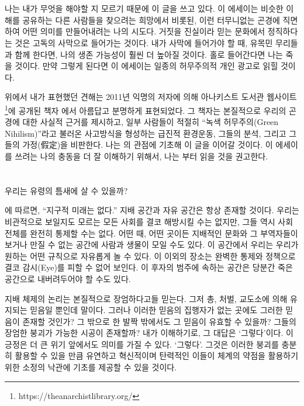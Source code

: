 \documentclass[10pt, b6paper, openany]{memoir}
\begin{document}
\begin{article}
\section{}

나는 내가 무엇을 해야할 지 모르기 때문에 이 글을 쓰고 있다. 이 에세이는 비슷한 이해를 공유하는 다른 사람들을 찾으려는 희망에서 비롯된, 이런 터무니없는 곤경에 직면하여 어떤 의미를 만들어내려는 나의 시도다. 거짓을 진실이라 믿는 문화에서 정직하다는 것은 고독의 사막으로 들어가는 것이다. 내가 사막에 들어가야 할 때, 유목민 무리들과 함께 한다면, 나의 생존 가능성이 훨씬 더 높아질 것이다. 홀로 들어간다면 나는 죽을 것이다. 만약 그렇게 된다면 이 에세이는 일종의 허무주의적 개인 광고로 읽힐 것이다.

위에서 내가 표현했던 견해는 2011년 익명의 저자에 의해 아나키스트 도서관 웹사이트\footnote{https://theanarchistlibrary.org/}에 공개된 책자 \parencite{bk:desert2011}에서 아름답고 분명하게 표현되었다. 그 책자는 본질적으로 우리의 곤경에 대한 사실적 근거를 제시하고, 일부 사람들이 적절히 ``녹색 허무주의(Green Nihilism)''라고 불러온 사고방식을 형성하는 급진적 환경운동, 그들의 분석, 그리고 그들의 가정(假定)을 비판한다. 나는 의 관점에 기초해 이 글을 이어갈 것이다. 이 에세이를 쓰려는 나의 충동을 더 잘 이해하기 위해서, 나는 부터 읽을 것을 권고한다.

\section{}

우리는 유령의 틈새에 살 수 있을까? 

에 따르면, ``지구적 미래는 없다.'' 지배 공간과 자유 공간은 항상 존재할 것이다. 우리는 비관적으로 보일지도 모르는 모든 사회를 결코 해방시킬 수는 없지만, 그들 역시 사회 전체를 완전히 통제할 수는 없다. 어떤 때, 어떤 곳이든 지배적인 문화와 그 부역자들이 보거나 만질 수 없는 공간에 사람과 생물이 모일 수도 있다. 이 공간에서 우리는 우리가 원하는 어떤 규칙으로 자유롭게 놀 수 있다. 이 이외의 장소는 완벽한 통제와 정책으로 결코 감시(Eye)를 피할 수 없어 보인다. 이 후자의 범주에 속하는 공간은 당분간 죽은 공간으로 내버려두어야 할 수도 있다. 

지배 체제의 논리는 본질적으로 장엄하다고들 믿는다. 그저 총, 처벌, 교도소에 의해 유지되는 믿음일 뿐인데 말이다. 그러나 이러한 믿음의 집행자가 없는 곳에도 그러한 믿음이 존재할 것인가? 그 밖으로 한 발짝 밖에서도 그 믿음이 유효할 수 있을까? 그들의 장엄한 붕괴가 가능한 시공이 존재할까? 내가 이해하기로, 그 대답은 `그렇다'이다. 이 긍정은 더 큰 위기 앞에서도 의미를 가질 수 있다. `그렇다'. 그것은 이러한 붕괴를 충분히 활용할 수 있을 만큼 유연하고 혁신적이며 탄력적인 이들이 체계의 약점을 활용하기 위한 소정의 낙관에 기초를 제공할 수 있을 것이다. 


\end{article}
\end{document}

